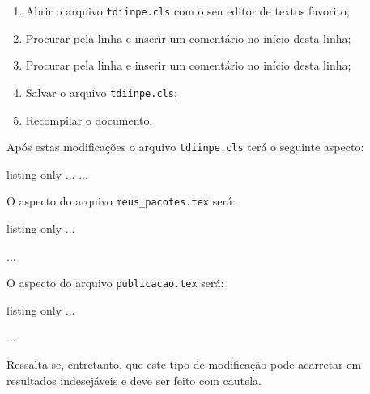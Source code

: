 \begingroup
\renewcommand{\labelenumi}{\arabic{enumi}.}
\begin{enumerate}
	\item Abrir o arquivo {\tt tdiinpe.cls} com o seu editor de textos favorito;
	\item Procurar pela linha \texttt{\RequirePackage{subfigure}} e inserir um comentário no início desta linha;
	\item Procurar pela linha \texttt{\RequirePackage[subfigure]{tocloft}} e inserir um comentário no início desta linha;
	\item Salvar o arquivo {\tt tdiinpe.cls};
	\item Recompilar o documento.
\end{enumerate}
\endgroup

Após estas modificações o arquivo {\tt tdiinpe.cls} terá o seguinte aspecto:

\begin{texexp}{listing only}
...
\RequirePackage{amsmath,amssymb,amsthm} %
\RequirePackage{makeidx} %
\RequirePackage{eso-pic}
...
\end{texexp}

O aspecto do arquivo {\tt meus\_pacotes.tex} será:

\begin{texexp}{listing only}
...
\usepackage{subfig}
...
\end{texexp}

O aspecto do arquivo {\tt publicacao.tex} será:

\begin{texexp}{listing only}
...


 



\makeindex  

 
...
\end{texexp}

\begin{marker}
Ressalta-se, entretanto, que este tipo de modificação pode acarretar em resultados indesejáveis e deve ser feito com cautela. 
\end{marker}